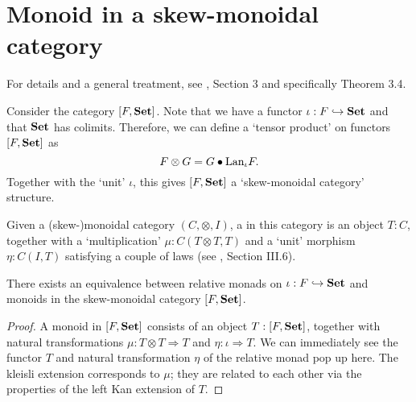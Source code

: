 \section{Monoid in a skew-monoidal category}
For details and a general treatment, see \cite{monads-endofunctors}, Section 3 and specifically Theorem 3.4.

\begin{definition}
  Consider the category $ [F, \mathbf{Set}] $. Note that we have a functor $ \iota: F \hookrightarrow \mathbf{Set} $ and that $ \mathbf{Set} $ has colimits. Therefore, we can define a `tensor product' on functors $ [F, \mathbf{Set}] $ as
  \[ F \otimes G = G \bullet \text{Lan}_{\iota}F. \]
  Together with the `unit' $ \iota $, this gives $ [F, \mathbf{Set}] $ a `skew-monoidal category' structure.
\end{definition}

\begin{definition}
  Given a (skew-)monoidal category $ (C, \otimes, I) $, a  in this category is an object $ T : C $, together with a `multiplication' $ \mu: C(T \otimes T, T) $ and a `unit' morphism $ \eta: C(I, T) $ satisfying a couple of laws (see \cite{MacLane}, Section III.6).
\end{definition}

\begin{lemma}
  There exists an equivalence between relative monads on $ \iota: F \hookrightarrow \mathbf{Set} $ and monoids in the skew-monoidal category $ [F, \mathbf{Set}] $.
\end{lemma}
\begin{proof}
  A monoid in $ [F, \mathbf{Set}] $ consists of an object $ T: [F, \mathbf{Set}] $, together with natural transformations $ \mu: T \otimes T \Rightarrow T $ and $ \eta: \iota \Longrightarrow T $. We can immediately see the functor $ T $ and natural transformation $ \eta $ of the relative monad pop up here. The kleisli extension corresponds to $ \mu $; they are related to each other via the properties of the left Kan extension of $ T $.
\end{proof}
